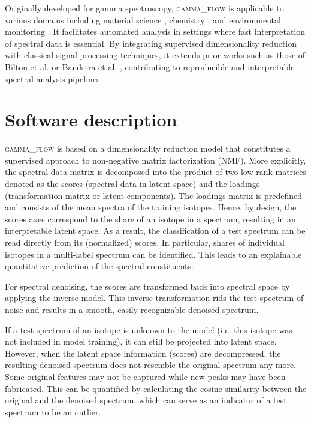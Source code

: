 \documentclass[review, 12pt, a4paper]{elsarticle}
\begin{document}
Originally developed for gamma spectroscopy, \textsc{gamma\_flow} is applicable to various domains including material science \cite{Zatsepin2021a}, chemistry \cite{Roessler2018}, and environmental monitoring \cite{Qi2024}. It facilitates automated analysis in settings where fast interpretation of spectral data is essential. By integrating supervised dimensionality reduction with classical signal processing techniques, it extends prior works such as those of Bilton et al. \cite{Bilton2019} or Bandstra et al. \cite{Bandstra2020}, contributing to reproducible and interpretable spectral analysis pipelines.



\section{Software description}
\label{sec:software_description}

\textsc{gamma\_flow} is based on a dimensionality reduction model that constitutes a supervised approach to non-negative matrix factorization (NMF). More explicitly, the spectral data matrix is decomposed into the product of two low-rank matrices denoted as the scores (spectral data in latent space) and the loadings (transformation matrix or latent components). The loadings matrix is predefined and consists of the mean spectra of the training isotopes. Hence, by design, the scores axes correspond to the share of an isotope in a spectrum, resulting in an interpretable latent space. As a result, the classification of a test spectrum can be read directly from its (normalized) scores. In particular, shares of individual isotopes in a multi-label spectrum can be identified. This leads to an explainable quantitative prediction of the spectral constituents. 

For spectral denoising, the scores are transformed back into spectral space by applying the inverse model. This inverse transformation rids the test spectrum of noise and results in a smooth, easily recognizable denoised spectrum. 

If a test spectrum of an isotope is unknown to the model (i.e. this isotope was not included in model training), it can still be projected into latent space. However, when the latent space information (scores) are decompressed, the resulting denoised spectrum does not resemble the original spectrum any more. Some original features may not be captured while new peaks may have been fabricated. This can be quantified by calculating the cosine similarity between the original and the denoised spectrum, which can serve as an indicator of a test spectrum 
to be an outlier.
\end{document}
